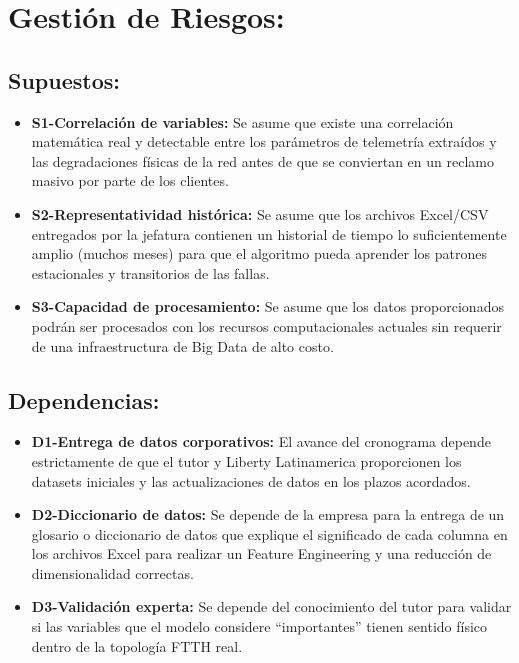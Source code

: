 \documentclass[12pt,a4paper]{article}
\begin{document}
\section{Gestión de Riesgos:}
    \label{sec:riesgos}

        \subsection{\textbf{Supuestos:}}
                    \begin{itemize}
                        \item \textbf{S1-Correlación de variables:} Se asume que existe una correlación matemática real y detectable entre los parámetros de telemetría extraídos y las degradaciones físicas de la red antes de que se conviertan en un reclamo masivo por parte de los clientes.
                        \item \textbf{S2-Representatividad histórica:} Se asume que los archivos Excel/CSV entregados por la jefatura contienen un historial de tiempo lo suficientemente amplio (muchos meses) para que el algoritmo pueda aprender los patrones estacionales y transitorios de las fallas.
                        \item \textbf{S3-Capacidad de procesamiento:} Se asume que los datos proporcionados podrán ser procesados con los recursos computacionales actuales sin requerir de una infraestructura de Big Data de alto costo.
                    \end{itemize}
        \subsection{\textbf{Dependencias:}}
                    \begin{itemize}
                        \item \textbf{D1-Entrega de datos corporativos:} El avance del cronograma depende estrictamente de que el tutor y Liberty Latinamerica proporcionen los datasets iniciales y las actualizaciones de datos en los plazos acordados.
                        \item \textbf{D2-Diccionario de datos:} Se depende de la empresa para la entrega de un glosario o diccionario de datos que explique el significado de cada columna en los archivos Excel para realizar un Feature Engineering y una reducción de dimensionalidad correctas.
                        \item \textbf{D3-Validación experta:} Se depende del conocimiento del tutor para validar si las variables que el modelo considere ``importantes'' tienen sentido físico dentro de la topología FTTH real.
                    \end{itemize}
\end{document}
